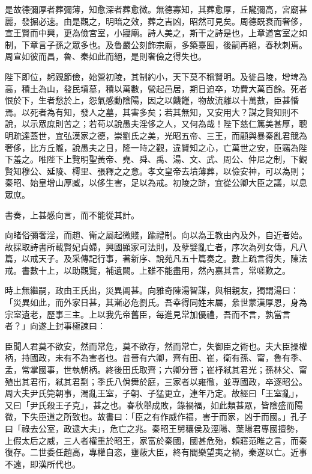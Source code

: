 \begin{pinyinscope}
是故德彌厚者葬彌薄，知愈深者葬愈微。無德寡知，其葬愈厚，丘隴彌高，宮廟甚麗，發掘必速。由是觀之，明暗之效，葬之吉凶，昭然可見矣。周德既衰而奢侈，宣王賢而中興，更為儉宮室，小寢廟。詩人美之，斯干之詩是也，上章道宮室之如制，下章言子孫之眾多也。及魯嚴公刻飾宗廟，多築臺囿，後嗣再絕，春秋刺焉。周宣如彼而昌，魯、秦如此而絕，是則奢儉之得失也。

陛下即位，躬親節儉，始營初陵，其制約小，天下莫不稱賢明。及徙昌陵，增埤為高，積土為山，發民墳墓，積以萬數，營起邑居，期日迫卒，功費大萬百餘。死者恨於下，生者愁於上，怨氣感動陰陽，因之以饑饉，物故流離以十萬數，臣甚惛焉。以死者為有知，發人之墓，其害多矣；若其無知，又安用大？謀之賢知則不說，以示眾庶則苦之；若苟以說愚夫淫侈之人，又何為哉！陛下慈仁篤美甚厚，聰明疏達蓋世，宜弘漢家之德，崇劉氏之美，光昭五帝、三王，而顧與暴秦亂君競為奢侈，比方丘隴，說愚夫之目，隆一時之觀，違賢知之心，亡萬世之安，臣竊為陛下羞之。唯陛下上覽明聖黃帝、堯、舜、禹、湯、文、武、周公、仲尼之制，下觀賢知穆公、延陵、樗里、張釋之之意。孝文皇帝去墳薄葬，以儉安神，可以為則；秦昭、始皇增山厚臧，以侈生害，足以為戒。初陵之跻，宜從公卿大臣之議，以息眾庶。

書奏，上甚感向言，而不能從其計。

向睹俗彌奢淫，而趙、衛之屬起微賤，踰禮制。向以為王教由內及外，自近者始。故採取詩書所載賢妃貞婦，興國顯家可法則，及孽嬖亂亡者，序次為列女傳，凡八篇，以戒天子。及采傳記行事，著新序、說苑凡五十篇奏之。數上疏言得失，陳法戒。書數十上，以助觀覽，補遺闕。上雖不能盡用，然內嘉其言，常嗟歎之。

時上無繼嗣，政由王氏出，災異阊甚。向雅奇陳湯智謀，與相親友，獨謂湯曰：「災異如此，而外家日甚，其漸必危劉氏。吾幸得同姓末屬，絫世蒙漢厚恩，身為宗室遺老，歷事三主。上以我先帝舊臣，每進見常加優禮，吾而不言，孰當言者？」向遂上封事極諫曰：

臣聞人君莫不欲安，然而常危，莫不欲存，然而常亡，失御臣之術也。夫大臣操權柄，持國政，未有不為害者也。昔晉有六卿，齊有田、崔，衛有孫、甯，魯有季、孟，常掌國事，世執朝柄。終後田氏取齊；六卿分晉；崔杼弒其君光；孫林父、甯殖出其君衎，弒其君剽；季氏八佾舞於庭，三家者以雍徹，並專國政，卒逐昭公。周大夫尹氏筦朝事，濁亂王室，子朝、子猛更立，連年乃定。故經曰「王室亂」，又曰「尹氏殺王子克」，甚之也。春秋舉成敗，錄禍福，如此類甚眾，皆陰盛而陽微，下失臣道之所致也。故書曰：「臣之有作威作福，害于而家，凶于而國。」孔子曰「祿去公室，政逮大夫」，危亡之兆。秦昭王舅穰侯及涇陽、葉陽君專國擅勢，上假太后之威，三人者權重於昭王，家富於秦國，國甚危殆，賴寤范睢之言，而秦復存。二世委任趙高，專權自恣，壅蔽大臣，終有閻樂望夷之禍，秦遂以亡。近事不遠，即漢所代也。


\end{pinyinscope}
